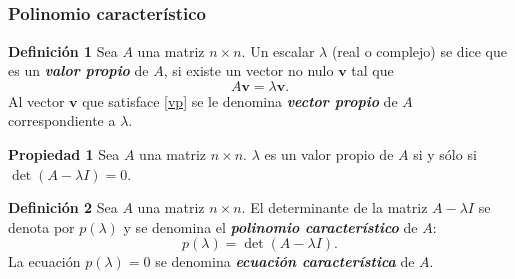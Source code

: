 
\subsection{}

{\nologo 
\begin{frame}\frametitle{Polinomio característico}

\vspace{-2mm}
\begin{defi}{\textbf{Definición 1}}\justifying
	\justifying
	Sea $A$ una matriz $n\times n$. Un escalar $\lambda$ (real o complejo) se dice que es un \textbf{\textit{valor propio}}
	de $A$, si existe un vector no nulo $\mathbf{v}$ tal que
	\begin{equation}\tag{1}%
	A \mathbf{v} = \lambda \mathbf{v}.
	\end{equation}
	Al vector $\mathbf{v}$ que satisface \eqref{vp} se le denomina \textbf{\textit{vector propio}} de $A$ correspondiente a $\lambda$.
\end{defi}	

\vspace{-1mm}
\begin{prop}{\textbf{Propiedad 1}}
	\justifying
	Sea $A$ una matriz $n\times n$. $\lambda$ es un valor propio de $A$ si y sólo si $\det(A-\lambda I)=0$.
\end{prop}	

\vspace{-1mm}
\begin{defi}{\textbf{Definición 2}}\justifying
	\justifying
	Sea $A$ una matriz $n\times n$. El determinante de la matriz $A-\lambda I$ se denota por $p(\lambda)$
	y se denomina el \textbf{\textbf{\textit{polinomio característico}}} de $A$:
	\[
		p(\lambda) = \det(A-\lambda I).
	\]
	La ecuación $p(\lambda) = 0$ se denomina \textbf{\textit{ecuación característica}} de $A$.
\end{defi}	

\end{frame}
}


\subsection{}

